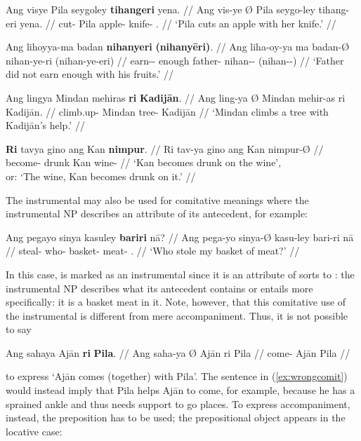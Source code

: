 \pex
\a\begingl
	\gla Ang visye {} Pila seygoley \textbf{tihangeri} yena. //
	\glb Ang vis-ye Ø Pila seygo-ley tihang-eri yena. //
	\glc \AgtT{} cut-\TsgF{} \Top{} Pila apple-\PargI{} 
		knife-\Ins{} \TsgF{}.\Gen{} //
	\glft `Pila cuts an apple with her knife.' //
\endgl

\a\begingl
	\gla Ang lihoyya-ma badan \textbf{nihanyeri} \textbf{(nihanyēri)}. //
	\glb Ang {liha-oy-ya ma} badan-Ø nihan-ye-ri (nihan-ye-eri) //
	\glc \AgtT{} {earn-\Neg{}-\TsgM{} enough} father-\Top{} 
		nihan-\Pl{}-\Ins{} (nihan-\Pl{}-\Ins) //
	\glft `Father did not earn enough with his fruits.' //
\endgl

\a\begingl
	\gla Ang lingya {} Mindan mehiras \textbf{ri} \textbf{Kadijān}. //
	\glb Ang ling-ya Ø Mindan mehir-as ri Kadijān. //
	\glc \AgtT{} climb.up-\TsgM{} \Top{} Mindan tree-\Parg{} 
		\Ins{} Kadijān //
	\glft `Mindan climbs a tree with Kadijān's help.' //
\endgl

\a\begingl
	\gla \textbf{Ri} tavya gino ang Kan \textbf{nimpur}. //
	\glb Ri tav-ya gino ang Kan nimpur-Ø //
	\glc \InsT{} become-\TsgM{} drunk \Aarg{} Kan wine-\Top{} //
	\glft `Kan becomes drunk on the wine', \\
		or: `The wine, Kan becomes drunk on it.' //
\endgl

\xe

The instrumental may also be used for comitative meanings where the 
instrumental NP describes an attribute of its antecedent, for example:

\ex\begingl
	\gla Ang pegayo sinya kasuley \textbf{bariri} nā? //
	\glb Ang pega-yo sinya-Ø kasu-ley bari-ri nā //
	\glc \AgtT{} steal-\TsgN{} who-\Top{} basket-\PargI{} 
		meat-\Ins{} \Fsg{}.\Gen{} //
	\glft `Who stole my basket of meat?' //
\endgl\xe

In this case,  is marked as an instrumental since it is an
attribute of sorts to : the instrumental NP describes what its
antecedent contains or entails more specifically: it is a basket  meat
in it. Note, however, that this comitative use of the instrumental is different
from mere accompaniment. Thus, it is not possible to say

\ex\label{ex:wrongcomit}\ljudge* \begingl
	\gla Ang sahaya {} Ajān \textbf{ri} \textbf{Pila}. //
	\glb Ang saha-ya Ø Ajān ri Pila //
	\glc \AgtT{} come-\TsgM{} \Top{} Ajān \Ins{} Pila //
\endgl\xe

\noindent to express `Ajān comes (together) with Pila'. The sentence in 
(\ref{ex:wrongcomit}) would instead imply that Pila helps Ajān to come, for 
example, because he has a sprained ankle and thus needs support to go places. 
To express accompaniment, instead, the preposition  has to be used; the prepositional object appears in the locative 
case:

